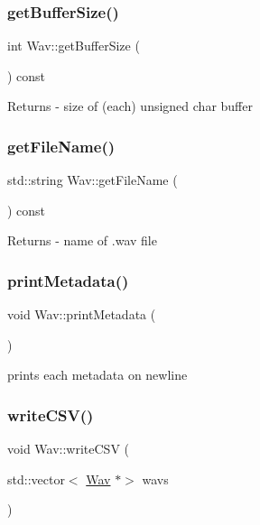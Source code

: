 \subsubsection{\texorpdfstring{get\+Buffer\+Size()}{getBufferSize()}}
{\footnotesize\ttfamily int Wav\+::get\+Buffer\+Size (\begin{DoxyParamCaption}{ }\end{DoxyParamCaption}) const}

\begin{DoxyReturn}{Returns}
-\/ size of (each) unsigned char buffer 
\end{DoxyReturn}
\mbox{\label{classWav_ab091dcb5c70b025779d4073e344e60f2}} 
\subsubsection{\texorpdfstring{get\+File\+Name()}{getFileName()}}
{\footnotesize\ttfamily std\+::string Wav\+::get\+File\+Name (\begin{DoxyParamCaption}{ }\end{DoxyParamCaption}) const}

\begin{DoxyReturn}{Returns}
-\/ name of .wav file 
\end{DoxyReturn}
\mbox{\label{classWav_a52240b5a0803b1fd074b98d79b51e589}} 
\subsubsection{\texorpdfstring{print\+Metadata()}{printMetadata()}}
{\footnotesize\ttfamily void Wav\+::print\+Metadata (\begin{DoxyParamCaption}{ }\end{DoxyParamCaption})}

prints each metadata on newline \mbox{\label{classWav_a6f8162ea823152663dd7f556612c220e}} 
\subsubsection{\texorpdfstring{write\+C\+S\+V()}{writeCSV()}}
{\footnotesize\ttfamily void Wav\+::write\+C\+SV (\begin{DoxyParamCaption}\item[{std\+::vector$<$ \hyperlink{classWav}{Wav} $\ast$$>$}]{wavs }\end{DoxyParamCaption})}

